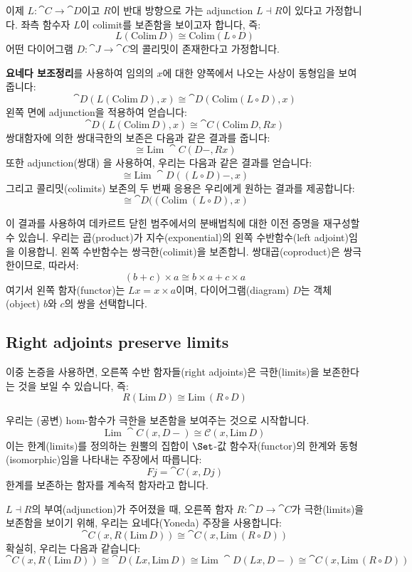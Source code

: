 \documentclass[DaoFP]{subfiles}
\begin{document}
이제 $L \colon \cat C \to \cat D$이고 $R$이 반대 방향으로 가는 adjunction $L \dashv R$이 있다고 가정합니다. 좌측 함수자 $L$이 colimit를 보존함을 보이고자 합니다, 즉:
\[ L (\text{Colim} \, D) \cong \text{Colim} (L \circ D) \]
어떤 다이어그램 $D \colon \cat J \to \cat C$의 콜리밋이 존재한다고 가정합니다.

\textbf{요네다 보조정리}를 사용하여 임의의 $x$에 대한 양쪽에서 나오는 사상이 동형임을 보여줍니다:
\[ \cat D( L (\text{Colim} \, D), x) \cong \cat D (\text{Colim} (L \circ D), x) \]
왼쪽 면에 adjunction을 적용하여 얻습니다:
\[ \cat D( L (\text{Colim} \, D), x) \cong \cat C (\text{Colim}\, D, R x) \]
쌍대함자에 의한 쌍대극한의 보존은 다음과 같은 결과를 줍니다:
\[ \cong \text{Lim}\; \cat C(D -, R x) \]
또한 adjunction(쌍대) 을 사용하여, 우리는 다음과 같은 결과를 얻습니다:
\[ \cong \text{Lim}\; \cat D((L \circ D) -, x) \]
그리고 콜리밋(colimits) 보존의 두 번째 응용은 우리에게 원하는 결과를 제공합니다:
\[ \cong  \cat D((\text{Colim}\;(L \circ D), x) \]

이 결과를 사용하여 데카르트 닫힌 범주에서의 분배법칙에 대한 이전 증명을 재구성할 수 있습니. 우리는 곱(product)가 지수(exponential)의 왼쪽 수반함수(left adjoint)임을 이용합니. 왼쪽 수반함수는 쌍극한(colimit)을 보존합니. 쌍대곱(coproduct)은 쌍극한이므로, 따라서:
\[(b + c) \times a \cong b \times a + c \times a \]
여기서 왼쪽 함자(functor)는 $L x = x \times a$이며, 다이어그램(diagram) $D$는 객체(object) $b$와 $c$의 쌍을 선택합니다.

\subsection{Right adjoints preserve limits}
이중 논증을 사용하면, 오른쪽 수반 함자들(right adjoints)은 극한(limits)을 보존한다는 것을 보일 수 있습니다, 즉:
\[ R (\text{Lim}\, D) \cong \text{Lim}\, (R \circ D) \]

우리는 (공변) hom-함수가 극한을 보존함을 보여주는 것으로 시작합니다.
\[ \text{Lim}\; \cat C( x, D-) \cong \mathcal{C}(x, \text{Lim}\,D) \]
이는 한계(limits)를 정의하는 원뿔의 집합이 $\Set$-값 함수자(functor)의 한계와 동형(isomorphic)임을 나타내는 주장에서 따릅니다:
\[ F j = \cat C(x, D j) \]
한계를 보존하는 함자를  계속적 함자라고 합니다.

$L \dashv R$의 부여(adjunction)가 주어졌을 때, 오른쪽 함자 $R \colon \cat D \to \cat C$가 극한(limits)을 보존함을 보이기 위해, 우리는 요네다(Yoneda) 주장을 사용합니다:
\[ \cat C(x, R (\text{Lim}\, D)) \cong \cat C (x, \text{Lim}\, (R \circ D)) \]
확실히, 우리는 다음과 같습니다:
\[ \cat C(x, R (\text{Lim}\, D)) \cong \cat D(L x, \text{Lim}\, D) \cong \text{Lim}\; \cat D(L x, D-) \cong \cat C(x, \text{Lim}\, (R \circ D))\]
\end{document}

